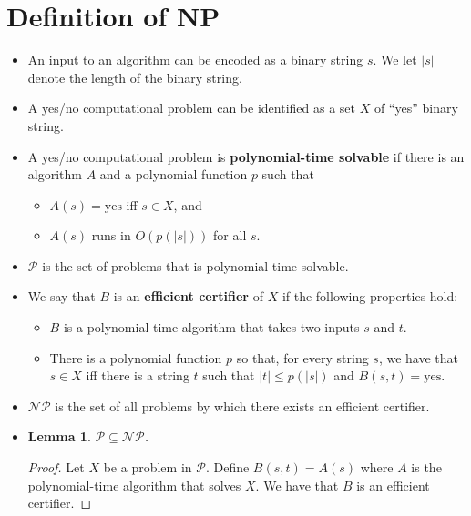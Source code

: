 \documentclass[10pt]{article}
\newtheorem{lemma}{Lemma}[section]
\begin{document}
  \section{Definition of NP} %
  \label{sec:definition_of_np}
  
  \begin{itemize}
    \item An input to an algorithm can be encoded as a binary string $s$.
      We let $|s|$ denote the length of the binary string.
      
    \item A yes/no computational problem can be identified as a set $X$
      of ``yes'' binary string.
      
    \item A yes/no computational problem is \textbf{polynomial-time solvable}
      if there is an algorithm $A$ and a polynomial function $p$ such that
      \begin{itemize}
        \item $A(s) = \mathrm{yes}$ iff $s \in X$, and
        \item $A(s)$ runs in $O(p(|s|))$ for all $s$.
      \end{itemize}
  
    \item $\mathcal{P}$ is the set of problems that is polynomial-time solvable.
      
    \item We say that $B$ is an \textbf{efficient certifier} of $X$ if the following properties hold:
      \begin{itemize}
        \item $B$ is a polynomial-time algorithm that takes two inputs $s$ and $t$.
        \item There is a polynomial function $p$ so that, for every string $s$, we have
          that $s \in X$ iff there is a string $t$ such that $|t| \leq p(|s|)$ and $B(s,t) = \mathrm{yes}$.
      \end{itemize}
      
    \item $\mathcal{NP}$ is the set of all problems by which there exists an efficient certifier.
    
    \item \begin{lemma}
      $\mathcal{P} \subseteq \mathcal{NP}$.
    \end{lemma}
    \begin{proof}
      Let $X$ be a problem in $\mathcal{P}$. 
      Define $B(s,t) = A(s)$ where $A$ is the polynomial-time algorithm that solves $X$.
      We have that $B$ is an efficient certifier.
    \end{proof}        
  \end{itemize}
  
\end{document}
